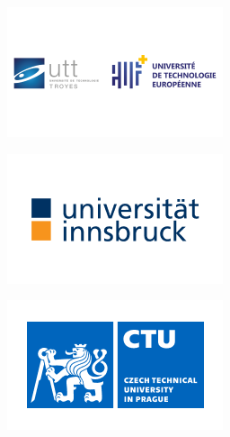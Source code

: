 \documentclass{beamer}
\begin{document}
\begin{frame}
{{\begin{minipage}{.15\textwidth}\includegraphics[width=\columnwidth]{../img/logo_utt.png}\end{minipage}%
\begin{minipage}{.15\textwidth}\includegraphics[width=\columnwidth]{../img/logo_uibk.png}\end{minipage}%
\begin{minipage}{.15\textwidth}\includegraphics[width=\columnwidth]{../img/logo_ctu.png}\end{minipage}%
}}
\end{frame}
\end{document}
